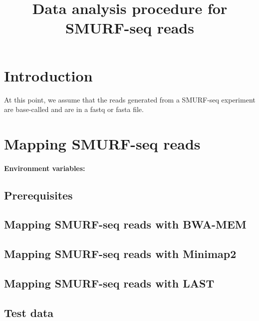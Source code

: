 \documentclass[11pt]{article}
\title{Data analysis procedure for SMURF-seq reads}
\date{}
\begin{document}
\maketitle

\section{Introduction}
At this point, we assume that the reads generated from a 
SMURF-seq experiment are base-called and are in a fastq or
fasta file.


\section{Mapping SMURF-seq reads}

\paragraph{Environment variables:}

\subsection{Prerequisites}

\subsection{Mapping SMURF-seq reads with BWA-MEM}

\subsection{Mapping SMURF-seq reads with Minimap2}

\subsection{Mapping SMURF-seq reads with LAST}

\subsection{Test data}
\end{document}
